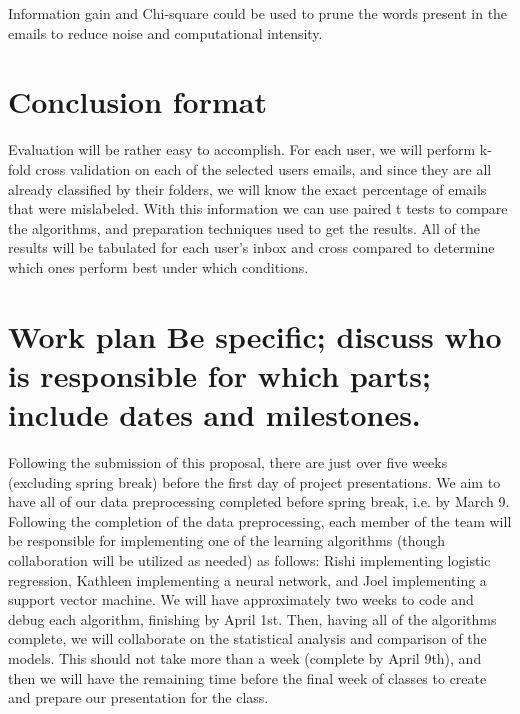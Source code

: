 \documentclass[11pt]{article}
\begin{document}
Information gain and Chi-square could be used to prune the words present in the emails to reduce noise and computational intensity.
\section{Conclusion format}
\label{sec-5}


Evaluation will be rather easy to accomplish. For each user, we will perform k-fold cross validation on each of the selected users emails, and since they are all already classified by their folders, we will know the exact percentage of emails that were mislabeled. With this information we can use paired t tests to compare the algorithms, and preparation techniques used to get the results. All of the results will be tabulated for each user’s inbox and cross compared to determine which ones perform best under which conditions.
\section{Work plan Be specific; discuss who is responsible for which parts; include dates and milestones.}
\label{sec-6}


Following the submission of this proposal, there are just over five weeks (excluding spring break) before the first day of project presentations.  We aim to have all of our data preprocessing completed before spring break, i.e. by March 9.  Following the completion of the data preprocessing, each member of the team will be responsible for implementing one of the learning algorithms (though collaboration will be utilized as needed) as follows: Rishi implementing logistic regression, Kathleen implementing a neural network, and Joel implementing a support vector machine.  We will have approximately two weeks to code and debug each algorithm, finishing by April 1st.  Then, having all of the algorithms complete, we will collaborate on the statistical analysis and comparison of the models.  This should not take more than a week (complete by April 9th), and then we will have the remaining time before the final week of classes to create and prepare our presentation for the class.
\end{document}
